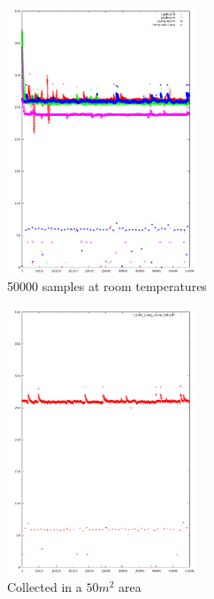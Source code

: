 \documentclass[10pt,a4paper]{article}
\begin{document}
\begin{figure}[H!]
  \caption{50000 samples at room temperatures}
  \centering
  \includegraphics[width=0.5\textwidth]{img/RoomTempOverlay.png}
\end{figure}


\begin{figure}[H!]
  \caption{Collected in a $50m^2$ area}
  \centering
  \includegraphics[width=0.5\textwidth]{img/LivingRoom50kFull.png}
\end{figure}
\end{document}
